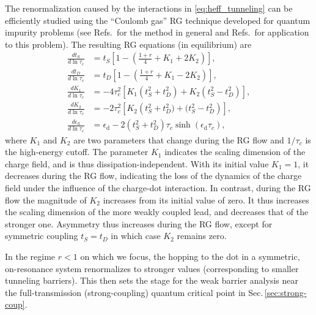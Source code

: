 \documentclass[aps,prb,reprint,floatfix,superscriptaddress,amssymb,amsmath]{revtex4-2}
\begin{document}
The renormalization caused by the interactions in \eqref{eq:heff_tunneling} can be efficiently studied using the ``Coulomb gas'' RG technique developed for quantum impurity problems (see Refs.\,\cite{AndYuvalHamannPRB70,KaneFisherPRB92} for the method in general and Refs.\,\cite{SchillerIngersentEPL97,LiuRLdissipPRB14} for application to this problem). The resulting RG equations (in equilibrium) are
\begin{equation}
    \begin{aligned}
    \frac{dt_S}{d\ln \tau_c} &= t_S\left[1 - \left(\frac{1+r}{4} + K_1 + 2K_2\right)\right], \\
    \frac{dt_D}{d\ln \tau_c} &= t_D\left[1 - \left(\frac{1+r}{4} + K_1 - 2K_2\right)\right],\\
    \frac{dK_1}{d\ln\tau_c} &= -4 \tau_c^2\left[ K_1 \left(t_S^2 + t_D^2\right) + K_2 (t_S^2 - t_D^2) \right],\\
      \frac{dK_2}{d\ln\tau_c} &= -2 \tau_c^2\left[ K_2 \left(t_S^2 + t_D^2) + (t_S^2 - t_D^2\right) \right],\\
    \frac{d  \epsilon_\text{d}}{d\ln\tau_c} &= \epsilon_\text{d} 
    - 2 \left( t_S^2+ t_D^2 \right) \tau_c \sinh (\epsilon_\text{d} \tau_c),
    \end{aligned}
    \label{eq:rg_weak_ccoupling}
\end{equation}
where $K_1$ and $K_2$ are two parameters that change during the RG flow and $1/\tau_c$ is the high-energy cutoff.
The parameter $K_1$ indicates the scaling dimension of the charge field, and is thus dissipation-independent.
With its initial value $K_1 \!=\! 1$, it decreases during the RG flow, indicating the loss of the dynamics of the charge field under the influence of the charge-dot interaction.
In contrast, during the RG flow the magnitude of $K_2$ increases from its initial value of zero.
It thus increases the scaling dimension of the more weakly coupled lead, and decreases that of the stronger one. Asymmetry thus increases during the RG flow, except for symmetric coupling $t_S \!=\! t_D$ in which case $K_2$ remains zero.

In the regime $r\!<\!1$ on which we focus, the hopping to the dot in a symmetric, on-resonance system renormalizes to stronger values (corresponding to smaller tunneling barriers). This then sets the stage for the weak barrier analysis near the full-transmission (strong-coupling) quantum critical point  in Sec.\,\ref{sec:strong-coup}. 
\end{document}
